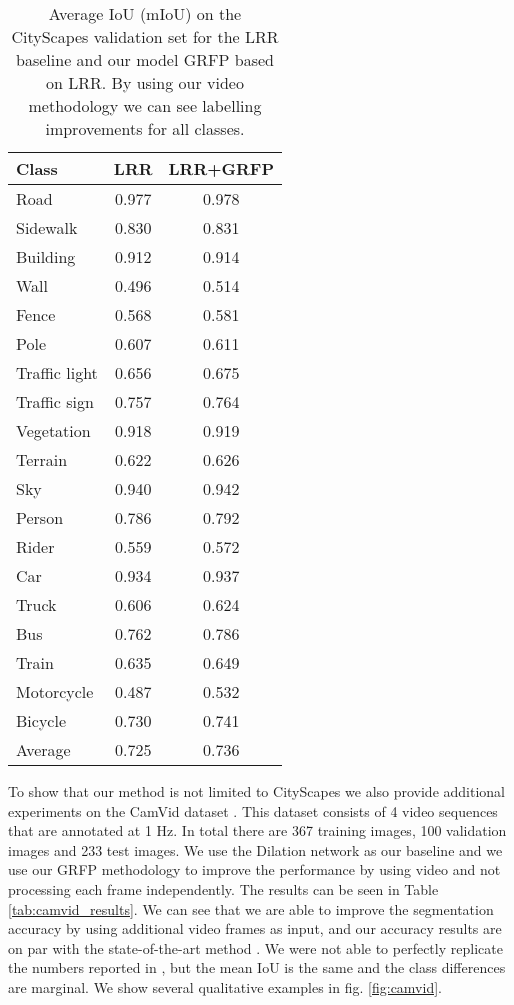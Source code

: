 \documentclass[10pt,twocolumn,letterpaper]{article}
\begin{document}
\begin{table}[!htbp]
\begin{center}
\small\begin{tabular}{|l|c|c|}
\hline
Class & LRR & LRR+GRFP\\
\hline
\hline
Road            & 0.977 & 0.978\\
Sidewalk        & 0.830 & 0.831\\
Building        & 0.912 & 0.914\\
Wall            & 0.496 & 0.514\\
Fence           & 0.568 & 0.581\\
Pole            & 0.607 & 0.611\\
Traffic light   & 0.656 & 0.675\\
Traffic sign    & 0.757 & 0.764\\
Vegetation      & 0.918 & 0.919\\
Terrain         & 0.622 & 0.626\\
Sky             & 0.940 & 0.942\\
Person          & 0.786 & 0.792\\
Rider           & 0.559 & 0.572\\
Car             & 0.934 & 0.937\\
Truck           & 0.606 & 0.624\\
Bus             & 0.762 & 0.786\\
Train           & 0.635 & 0.649\\
Motorcycle      & 0.487 & 0.532\\
Bicycle         & 0.730 & 0.741\\
\hline
Average         & 0.725 & 0.736 \\ \hline
\end{tabular}
\end{center}
\caption{Average IoU (mIoU) on the CityScapes validation set for the LRR baseline and our model GRFP based on LRR. By using our video methodology we can see labelling improvements for all classes.}
\label{tab:lrr_results}
\end{table}

 To show that our method is not limited to CityScapes we also provide additional experiments on the CamVid dataset \cite{brostow2009semantic}. This dataset consists of 4 video sequences that are annotated at 1 Hz. In total there are 367 training images, 100 validation images and 233 test images. We use the Dilation network \cite{yu2015multi} as our baseline and we use our GRFP methodology to improve the performance by using video and not processing each frame independently. The results can be seen in Table \ref{tab:camvid_results}. We can see that we are able to improve the segmentation accuracy by using additional video frames as input, and our accuracy results are on par with the state-of-the-art method \cite{kundu2016feature}. We were not able to perfectly replicate the numbers reported in \cite{yu2015multi}, but the mean IoU is the same and the class differences are marginal. We show several qualitative examples in fig. \ref{fig:camvid}.
\end{document}
